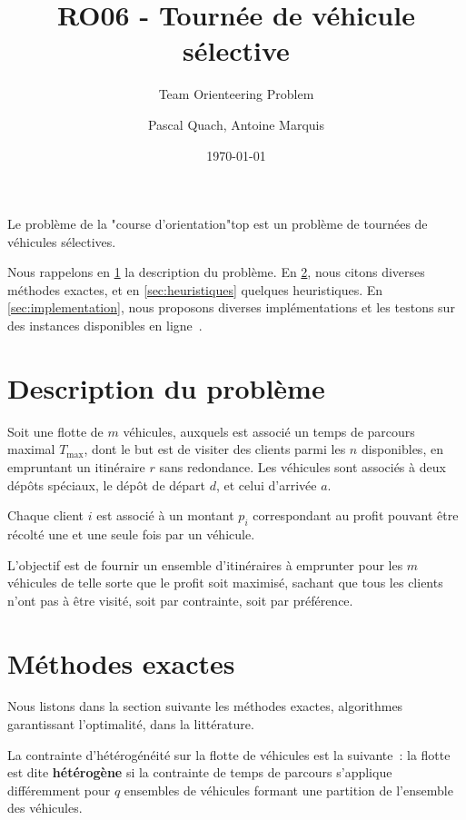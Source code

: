 \documentclass[a4paper]{scrartcl}
\title{RO06 - Tournée de véhicule sélective}
\subtitle{Team Orienteering Problem}
\author{Pascal Quach, Antoine Marquis}
\date{\today}
\begin{document}
\maketitle

Le problème de la "course d'orientation"\textemdash \gls{top} \textemdash est
un problème de tournées de véhicules sélectives.

Nous rappelons en \cref{sec:top-description} la description du problème. En
\cref{sec:méthodes-exactes}, nous citons diverses méthodes exactes, et en
\cref{sec:heuristiques} quelques heuristiques. En \cref{sec:implementation},
nous proposons diverses implémentations et les testons sur des instances
disponibles en ligne~\parencite{cib_test_instances,chao_1993,chao.etal_feb1996,tsiligirides_sep1984}.

\section{Description du problème}%
\label{sec:top-description}

Soit une flotte de $m$ véhicules, auxquels est associé un temps de parcours
maximal $T_{\max}$, dont le but est de visiter des clients parmi les $n$
disponibles, en empruntant un itinéraire $r$ sans redondance. Les véhicules
sont associés à deux dépôts spéciaux, le dépôt de départ $d$, et celui
d'arrivée $a$.

Chaque client $i$ est associé à un montant $p_i$ correspondant au profit
pouvant être récolté une et une seule fois par un véhicule.

L'objectif est de fournir un ensemble d'itinéraires à emprunter pour les $m$
véhicules de telle sorte que le profit soit maximisé, sachant que tous les
clients n'ont pas à être visité, soit par contrainte, soit par préférence.

\section{Méthodes exactes}%
\label{sec:méthodes-exactes}

Nous listons dans la section suivante les méthodes exactes, algorithmes
garantissant l'optimalité, dans la littérature. 

La contrainte d'hétérogénéité sur la flotte de véhicules est la suivante~: la
flotte est dite \textbf{hétérogène} si la contrainte de temps de parcours
s'applique différemment pour $q$ ensembles de véhicules formant une partition
de l'ensemble des véhicules.
\end{document}
